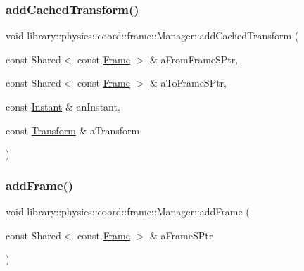 \subsubsection{\texorpdfstring{add\+Cached\+Transform()}{addCachedTransform()}}
{\footnotesize\ttfamily void library\+::physics\+::coord\+::frame\+::\+Manager\+::add\+Cached\+Transform (\begin{DoxyParamCaption}\item[{const Shared$<$ const \hyperlink{classlibrary_1_1physics_1_1coord_1_1_frame}{Frame} $>$ \&}]{a\+From\+Frame\+S\+Ptr,  }\item[{const Shared$<$ const \hyperlink{classlibrary_1_1physics_1_1coord_1_1_frame}{Frame} $>$ \&}]{a\+To\+Frame\+S\+Ptr,  }\item[{const \hyperlink{classlibrary_1_1physics_1_1time_1_1_instant}{Instant} \&}]{an\+Instant,  }\item[{const \hyperlink{classlibrary_1_1physics_1_1coord_1_1_transform}{Transform} \&}]{a\+Transform }\end{DoxyParamCaption})}

\mbox{\label{classlibrary_1_1physics_1_1coord_1_1frame_1_1_manager_a65ef93583a62089cb3192527babddab6}} 
\subsubsection{\texorpdfstring{add\+Frame()}{addFrame()}}
{\footnotesize\ttfamily void library\+::physics\+::coord\+::frame\+::\+Manager\+::add\+Frame (\begin{DoxyParamCaption}\item[{const Shared$<$ const \hyperlink{classlibrary_1_1physics_1_1coord_1_1_frame}{Frame} $>$ \&}]{a\+Frame\+S\+Ptr }\end{DoxyParamCaption})}

\mbox{\label{classlibrary_1_1physics_1_1coord_1_1frame_1_1_manager_ab17540188339548c7235a21236f8118e}} 
